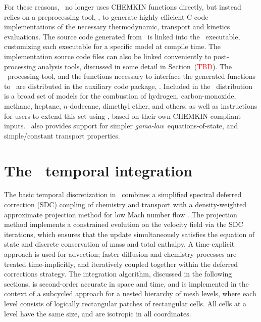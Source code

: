 For these reasons, \pelelm\ no longer uses CHEMKIN functions directly, but instead relies on a preprocessing tool, \fuego, to generate highly efficient C code implementations of the necessary thermodynamic, transport and kinetics evaluations.  The source code generated from \fuego\ is linked into the \pelelm\ executable, customizing each executable for a specific model at compile time.  The implementation source code files can also be linked conveniently to post-processing analysis tools, discussed in some detail in Section~(\textcolor{red}{TBD}). The \fuego\ processing tool, and the functions necessary to interface the generated functions to \pelelm\ are distributed in the auxiliary code package, \pelephysics.  Included in the \pelephysics\ distribution is a broad set of models for the combustion of hydrogen, carbon-monoxide, methane, heptane, $n$-dodecane, dimethyl ether, and others, as well as instructions for users to extend this set using \fuego, based on their own CHEMKIN-compliant inputs. \pelephysics\ also provides support for simpler \textit{gama-law}\ equations-of-state, and simple/constant transport properties.

\section{The \pelelm\ temporal integration}
The basic temporal discretization in \pelelm\ combines a simplified spectral deferred correction (SDC) coupling of chemistry and transport \cite{LMC_SDC} with a density-weighted approximate projection method for low Mach number flow \cite{DayBell:2000}.  The projection method implements a constrained evolution on the velocity field via the SDC iterations, which ensures that the update simultaneously satisfies the  equation of state and discrete conservation of mass and total enthalpy.
A time-explicit approach is used for advection; faster diffusion and chemistry processes are treated time-implicitly, and iteratively coupled together within the deferred corrections strategy. The integration algorithm, discussed in the following sections, is second-order accurate in space and time, and is implemented in the context of a subcycled approach for a nested hierarchy of mesh levels, where each level consists of logically rectangular patches of rectangular cells.  All cells at a level have the same size, and are isotropic in all coordinates.

